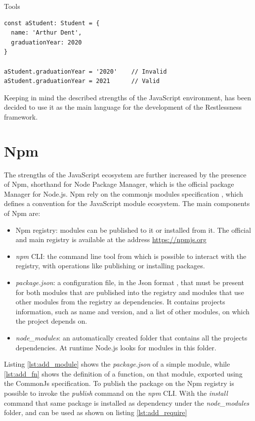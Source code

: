 \begin{chapter}{Tools}
\begin{lstlisting}[caption=Static type checking on Typescript, label={ts_static}]
const aStudent: Student = {
  name: 'Arthur Dent',
  graduationYear: 2020
}

aStudent.graduationYear = '2020'    // Invalid
aStudent.graduationYear = 2021      // Valid
    \end{lstlisting}

    Keeping in mind the described strengths of the JavaScript environment, has been
    decided to use it as the main language for the development of the Restlessness
    framework.

    \section{Npm}
    The strengths of the JavaScript ecosystem are further increased by the presence
    of Npm, shorthand for Node Package Manager, which is the official package Manager
    for Node.js. Npm rely on the commonjs modules specification \cite{common_js},
    which defines a convention for the JavaScript module ecosystem.
    The main components of Npm are:
    \begin{itemize}
        \item Npm registry: modules can be published to it or installed from it.
            The official and main registry is available at the address
            \url{https://npmjs.org}
        \item \textit{npm} CLI: the command line tool from which is possible to interact
            with the registry, with operations like publishing or installing packages.
        \item \textit{package.json}: a configuration file, in the Json format
            \cite{json_iso}, that must be present for both modules that are published
            into the registry and modules that use other modules from the registry
            as dependencies. It contains projects information, such as name and
            version, and a list of other modules, on which the project depends on.
        \item \textit{node\_modules}: an automatically created folder that contains
            all the projects dependencies. At runtime Node.js looks for modules
            in this folder.
    \end{itemize}

    Listing \ref{lst:add_module} shows the \textit{package.json} of a simple module,
    while \ref{lst:add_fn} shows the definition of a function, on that module,
    exported using the CommonJs specification. To publish the package on the Npm
    registry is possible to invoke the \textit{publish} command on the \textit{npm}
    CLI. With the \textit{install} command that same package is installed as
    dependency under the \textit{node\_modules} folder, and can be used as shown
    on listing \ref{lst:add_require}


\end{chapter}
